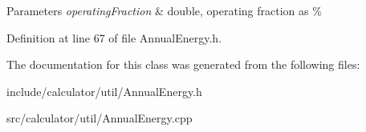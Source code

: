 \begin{DoxyParams}{Parameters}
{\em operating\+Fraction} & double, operating fraction as \% \\
\hline
\end{DoxyParams}


Definition at line 67 of file Annual\+Energy.\+h.



The documentation for this class was generated from the following files\+:\begin{DoxyCompactItemize}
\item 
include/calculator/util/Annual\+Energy.\+h\item 
src/calculator/util/Annual\+Energy.\+cpp\end{DoxyCompactItemize}
